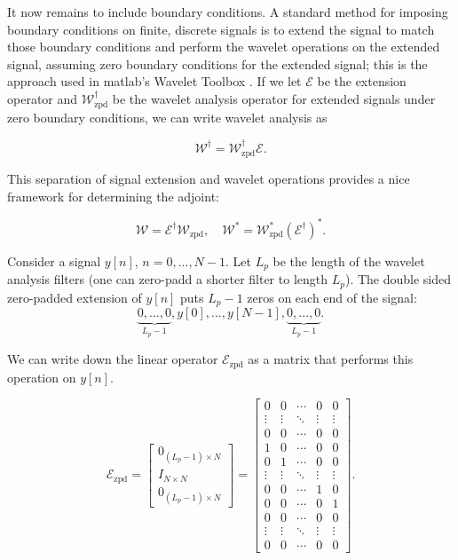 \documentclass[journal]{IEEEtran}
\begin{document}
It now remains to include boundary conditions.  A standard method for imposing boundary conditions on finite, discrete signals is to extend the signal to match those boundary conditions and perform the wavelet operations on the extended signal, assuming zero boundary conditions for the extended signal; this is the approach used in {\sc matlab}'s Wavelet Toolbox \cite{matlab_wt_2015}.  If we let $\mathcal{E}$ be the extension operator and $\mathcal{W}^\dagger_\text{zpd}$ be the wavelet analysis operator for extended signals under zero boundary conditions, we can write wavelet analysis as 

\[ \mathcal{W}^\dagger = \mathcal{W}^\dagger_\text{zpd}\mathcal{E}. \] 

\noindent This separation of signal extension and wavelet operations provides a nice framework for determining the adjoint:

\[ \mathcal{W} = \mathcal{E}^\dagger\mathcal{W}_\text{zpd}, \quad \mathcal{W}^\ast = \mathcal{W}^\ast_\text{zpd}(\mathcal{E}^\dagger)^\ast. \] 

Consider a signal $y[n]$, $n=0,...,N-1$.  Let $L_p$ be the length of the wavelet analysis filters (one can zero-padd a shorter filter to length $L_p$).  The double sided zero-padded extension of $y[n]$ puts $L_p-1$ zeros on each end of the signal:
\[ \underbrace{0, ..., 0}_{L_p-1}, y[0], ..., y[N-1], \underbrace{0, ..., 0}_{L_p-1}. \]

\noindent We can write down the linear operator $\mathcal{E}_\text{zpd}$ as a matrix that performs this operation on $y[n]$.

\[ \mathcal{E}_\text{zpd} = \begin{bmatrix} 0_{(L_p-1)\times N}\\ I_{N\times N}\\ 0_{(L_p-1)\times N}\end{bmatrix} = \begin{bmatrix} 0 & 0 & \cdots & 0 & 0\\ \vdots & \vdots &\ddots & \vdots & \vdots\\ 0 & 0 & \cdots & 0 & 0\\[0.5em] 1 & 0 & \cdots & 0 & 0\\ 0 & 1 & \cdots & 0 & 0\\ \vdots & \vdots & \ddots & \vdots & \vdots\\ 0 & 0 & \cdots & 1 & 0\\ 0 & 0 & \cdots & 0 & 1\\[0.5em] 0 & 0 & \cdots & 0 & 0\\ \vdots & \vdots & \ddots & \vdots & \vdots\\ 0 & 0 & \cdots & 0 & 0\end{bmatrix}. \] 
\end{document}
